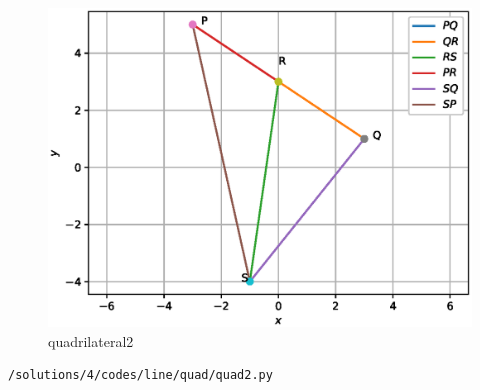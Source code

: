 \begin{enumerate}
\begin{figure}[!ht]
	\centering
	\includegraphics[width=\columnwidth]{./solutions/4/figures/line/quads/quad2.eps}
	\caption{quadrilateral2 }
	\label{fig:3.5.4_quadrilateral2}
\end{figure}
\begin{lstlisting}
/solutions/4/codes/line/quad/quad2.py
\end{lstlisting}
\end{enumerate}
